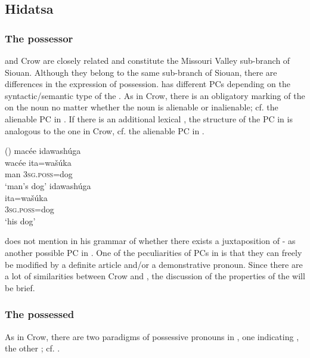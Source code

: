 \documentclass[output=paper]{LSP/langsci}
\begin{document}
\subsection{Hidatsa}\label{sec:helmbrecht:4.2} \label{hidatsa} 
\subsubsection{The possessor}
 and Crow are closely related and constitute the Missouri Valley sub-branch of Siouan. Although they belong to the same sub-branch of Siouan, there are differences in the expression of possession.  has different PCs depending on the syntactic/semantic type of the . As in Crow, there is an obligatory marking of the  on the  noun no matter whether the  noun is alienable or inalienable; cf. the alienable PC in . If there is an additional lexical , the structure of the PC in  is analogous to the one in Crow, cf. the alienable PC in .

\ea {} (\citealt[81]{Boyle2007})
\ea \label{hidatsamansdog}
\glll macée idawashúga \\ 
wacée ita=wašúka \\
man  \textsc{3sg.poss}=dog \\
\glt `man's dog'
\ex \label{hidatsahisdog}
\glll idawashúga \\
ita=wašúka \\
\textsc{3sg.poss}=dog \\
\glt `his dog'
\z \z

\citet{Boyle2007} does not mention in his grammar of  whether there exists a juxtaposition of - as another possible PC in . One of the peculiarities of PCs in  is that they can freely be modified by a definite article and/or a demonstrative pronoun. Since there are a lot of similarities between Crow and , the discussion of the properties of the  will be brief.

\subsubsection{The possessed}

As in Crow, there are two paradigms of possessive pronouns in , one indicating , the other ; cf. .
\end{document}
